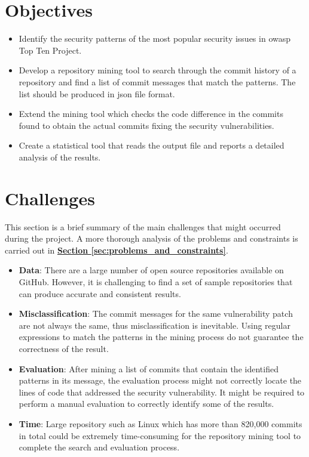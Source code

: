 \documentclass[12pt, a4paper]{report}
\begin{document}
\section{Objectives} \label{sec:objectives}
\begin{itemize}
  \item Identify the security patterns of the most popular security issues in \acrfull{owasp} Top
  Ten Project.
  \item Develop a repository mining tool to search through the commit history of a repository and
  find a list of commit messages that match the patterns. The list should be produced in
  \acrfull{json} file format.
  \item Extend the mining tool which checks the code difference in the commits found to obtain the
  actual commits fixing the security vulnerabilities.
  \item Create a statistical tool that reads the output file and reports a detailed analysis of the
  results.
\end{itemize}

\section{Challenges} \label{sec:challenges}
This section is a brief summary of the main challenges that might occurred during the project. A
more thorough analysis of the problems and constraints is carried out in
\hyperref[sec:problems_and_constraints]{\textbf{Section \ref*{sec:problems_and_constraints}}}.

\begin{itemize}
  \item \textbf{Data}: There are a large number of open source repositories available on GitHub.
  However, it is challenging to find a set of sample repositories that can produce accurate and
  consistent results.
  \item \textbf{Misclassification}: The commit messages for the same vulnerability patch are not
  always the same, thus misclassification is inevitable. Using regular expressions to match the
  patterns in the mining process do not guarantee the correctness of the result.
  \item \textbf{Evaluation}: After mining a list of commits that contain the identified patterns in
  its message, the evaluation process might not correctly locate the lines of code that addressed
  the security vulnerability. It might be required to perform a manual evaluation to correctly
  identify some of the results.
  \item \textbf{Time}: Large repository such as Linux which has more than 820,000 commits in total
  \cite{linux_repo} could be extremely time-consuming for the repository mining tool to complete the
  search and evaluation process.
\end{itemize}
\end{document}
